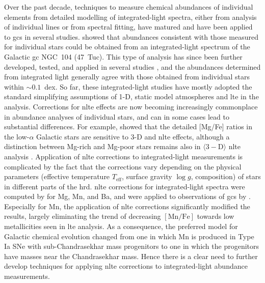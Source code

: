 \documentclass{aa}
\begin{document}
Over the past decade, techniques to measure chemical abundances of individual elements from detailed modelling of integrated-light spectra, either from analysis of individual lines or from spectral fitting, have matured and have been applied to \acp{gc} in several studies. \citet[][hereafter MB2008]{McWilliam2008} showed that abundances consistent with those measured for individual stars could be obtained from an integrated-light spectrum of the Galactic \ac{gc} NGC~104 (47~Tuc). This type of analysis has since been further developed, tested, and applied in several studies \citep{Colucci2009,Colucci2017,Larsen2012a,Larsen2014,Larsen2017,Sakari2013,Sakari2015,Sakari2016,Conroy2018,Renno2020}, and the abundances determined from integrated light generally agree with those obtained from individual stars within $\sim0.1$~dex. So far, these integrated-light studies have mostly adopted the standard simplifying assumptions of 1-D, static model atmospheres and \ac{lte} in the analysis. 
Corrections for \ac{nlte} effects are now becoming increasingly commonplace in abundance analyses of individual stars, and can in some cases lead to substantial differences. 
For example, \citet{Bergemann2017a,Bergemann2017} showed that the detailed [Mg/Fe] ratios in the low-$\alpha$ Galactic stars are sensitive to 3-D and \ac{nlte} effects, although a distinction between Mg-rich and Mg-poor stars remains also in $\langle 3-\mathrm{D} \rangle$ \ac{nlte} analysis \citep{Bergemann2017}.
Application of \ac{nlte} corrections to integrated-light measurements is complicated by the fact that the corrections vary depending on the physical parameters (effective temperature $T_\mathrm{eff}$, surface gravity $\log g$, composition) of stars in different parts of the \ac{hrd}.
\ac{nlte} corrections for integrated-light spectra were computed by \citet{Eitner2019} for Mg, Mn, and Ba, and were applied to observations of \acp{gc} by \citet{Eitner2020}. Especially for Mn, the application of \ac{nlte} corrections significantly modified the results, largely eliminating the trend of decreasing $\mathrm{[Mn/Fe]}$ towards low metallicities seen in \ac{lte} analysis. As a consequence, the preferred model for Galactic chemical evolution changed from one in which Mn is produced in Type Ia SNe with sub-Chandrasekhar mass progenitors to one in which the progenitors have masses near the Chandrasekhar mass.
Hence there is a clear need to further develop techniques for applying \ac{nlte} corrections to integrated-light abundance measurements. 
\end{document}
